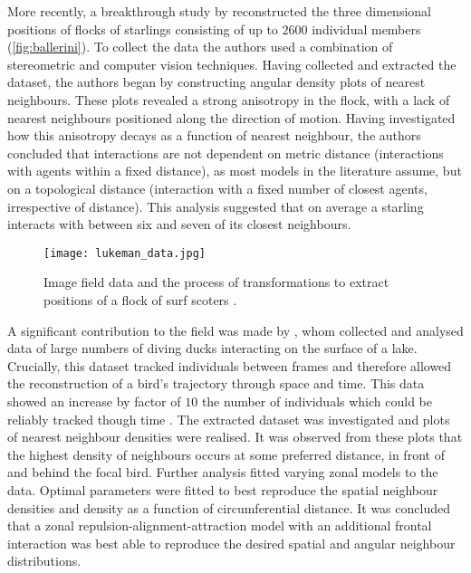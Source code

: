 More recently, a breakthrough study by \citet{ballerini08} reconstructed the three dimensional positions of flocks of starlings consisting of up to $2600$ individual members (\cref{fig:ballerini}). To collect the data the authors used a combination of stereometric and computer vision techniques. Having collected and extracted the dataset, the authors began by constructing angular density plots of nearest neighbours. These plots revealed a strong anisotropy in the flock, with a lack of nearest neighbours positioned along the direction of motion. Having investigated how this anisotropy decays as a function of nearest neighbour, the authors concluded that interactions are not dependent on metric distance (interactions with agents within a fixed distance), as most models in the literature assume, but on a topological distance (interaction with a fixed number of closest agents, irrespective of distance). This analysis suggested that on average a starling interacts with between six and seven of its closest neighbours.

\begin{figure}[t]
	\texttt{[image: lukeman\_data.jpg]}
	\caption{Image field data and the process of transformations to extract positions of a flock of surf scoters \citep{lukeman10}.}
	\label{fig:lukeman_extraction}
\end{figure}

A significant contribution to the field was made by \citet{lukeman10}, whom collected and analysed data of large numbers of diving ducks interacting on the surface of a lake. Crucially, this dataset tracked individuals between frames and therefore allowed the reconstruction of a bird's trajectory through space and time. This data showed an increase by factor of $10$ the number of individuals which could be reliably tracked though time \citep{lukeman09}. The extracted dataset was investigated and plots of nearest neighbour densities were realised. It was observed from these plots that the highest density of neighbours occurs at some preferred distance, in front of and behind the focal bird. Further analysis fitted varying zonal models to the data. Optimal parameters were fitted to best reproduce the spatial neighbour densities and density as a function of circumferential distance. It was concluded that a zonal repulsion-alignment-attraction model with an additional frontal interaction was best able to reproduce the desired spatial and angular neighbour distributions.


